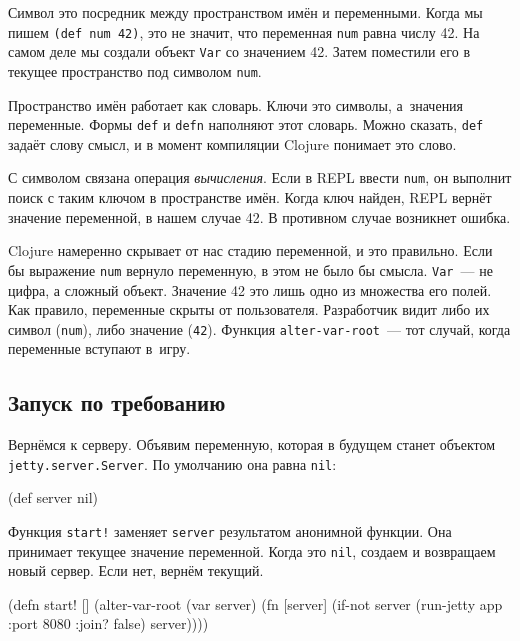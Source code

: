 
Символ это посредник между пространством имён и переменными. Когда мы пишем
\verb|(def num 42)|, это не значит, что переменная \verb|num| равна числу
42. На самом деле мы создали объект \verb|Var| со значением 42. Затем
поместили его в текущее пространство под символом \verb|num|.

Пространство имён работает как словарь. Ключи это символы, а~значения
переменные. Формы \verb|def| и \verb|defn| наполняют этот словарь. Можно
сказать, \verb|def| задаёт слову смысл, и в момент компиляции Clojure
понимает это слово.

С символом связана операция \emph{вычисления}. Если в REPL ввести \verb|num|,
он выполнит поиск с таким ключом в пространстве имён. Когда ключ найден, REPL
вернёт значение переменной, в нашем случае 42. В противном случае возникнет
ошибка.

Clojure намеренно скрывает от нас стадию переменной, и это правильно. Если бы
выражение \verb|num| вернуло переменную, в этом не было бы
смысла. \verb|Var|~--- не цифра, а сложный объект. Значение 42 это лишь одно
из множества его полей.  Как правило, переменные скрыты от
пользователя. Разработчик видит либо их символ (\verb|num|), либо значение
(\verb|42|). Функция \verb|alter-var-root|~--- тот случай, когда переменные
вступают в~игру.

\subsection{Запуск по требованию}

Вернёмся к серверу. Объявим переменную, которая в будущем станет объектом
\verb|jetty.server.Server|. По умолчанию она равна \verb|nil|:

\begin{english}
  \begin{clojure}
(def server nil)
  \end{clojure}
\end{english}

Функция \verb|start!| заменяет \verb|server| результатом анонимной
функции. Она принимает текущее значение переменной. Когда это \verb|nil|,
создаем и возвращаем новый сервер. Если нет, вернём текущий.

\begin{english}
  \begin{clojure}
(defn start! []
  (alter-var-root
   (var server)
   (fn [server]
     (if-not server
       (run-jetty app {:port 8080 :join? false})
       server))))
  \end{clojure}
\end{english}

